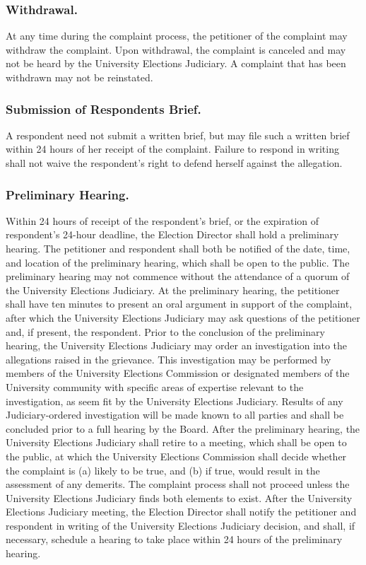 \subsubsection{Withdrawal.}
At any time during the complaint process, the petitioner of the complaint may withdraw the complaint.  Upon withdrawal, the complaint is canceled and may not be heard by the University Elections Judiciary.  A complaint that has been withdrawn may not be reinstated.
\subsubsection{Submission of Respondents Brief.}
A respondent need not submit a written brief, but may file such a written brief within 24 hours of her receipt of the complaint.  Failure to respond in writing shall not waive the respondent's right to defend herself against the allegation.

\subsubsection{Preliminary Hearing.}
\subsubsubsection{}
Within 24 hours of receipt of the respondent's brief, or the expiration of respondent's 24-hour deadline, the Election Director shall hold a preliminary hearing.  The petitioner and respondent shall both be notified of the date, time, and location of the preliminary hearing, which shall be open to the public.  The preliminary hearing may not commence without the attendance of a quorum of the University Elections Judiciary.
\subsubsubsection{}
At the preliminary hearing, the petitioner shall have ten minutes to present an oral argument in support of the complaint, after which the University Elections Judiciary may ask questions of the petitioner and, if present, the respondent.
\subsubsubsection{}
Prior to the conclusion of the preliminary hearing, the University Elections Judiciary may order an investigation into the allegations raised in the grievance. This investigation may be performed by members of the University Elections Commission or designated members of the University community with specific areas of expertise relevant to the investigation, as seem fit by the University Elections Judiciary. Results of any Judiciary-ordered investigation will be made known to all parties and shall be concluded prior to a full hearing by the Board.
\subsubsubsection{}
After the preliminary hearing, the University Elections Judiciary shall retire to a meeting, which shall be open to the public, at which the University Elections Commission shall decide whether the complaint is (a) likely to be true, and (b) if true, would result in the assessment of any demerits.  The complaint process shall not proceed unless the University Elections Judiciary finds both elements to exist.
\subsubsubsection{}
After the University Elections Judiciary meeting, the Election Director shall notify the petitioner and respondent in writing of the University Elections Judiciary decision, and shall, if necessary, schedule a hearing to take place within 24 hours of the preliminary hearing.

